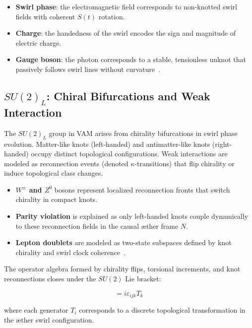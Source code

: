 \documentclass[preprint]{revtex4-2}
\begin{document}
    \begin{itemize}
        \item \textbf{Swirl phase}: the electromagnetic field corresponds to non-knotted swirl fields with coherent \( S(t) \) rotation.
        \item \textbf{Charge}: the handedness of the swirl encodes the sign and magnitude of electric charge.
        \item \textbf{Gauge boson}: the photon corresponds to a stable, tensionless unknot that passively follows swirl lines without curvature~\cite{ranada1992knots}.
    \end{itemize}

    \subsection{\textbf{\boldmath\texorpdfstring{$SU(2)_L$}{SU(2)L}}: Chiral Bifurcations and Weak Interaction}
    The \( SU(2)_L \) group in VAM arises from chirality bifurcations in swirl phase evolution. Matter-like knots (left-handed) and antimatter-like knots (right-handed) occupy distinct topological configurations. Weak interactions are modeled as reconnection events (denoted \( \kappa \)-transitions) that flip chirality or induce topological class changes.

    \begin{itemize}
        \item \textbf{\( W^\pm \) and \( Z^0 \)} bosons represent localized reconnection fronts that switch chirality in compact knots.
        \item \textbf{Parity violation} is explained as only left-handed knots couple dynamically to these reconnection fields in the causal æther frame \( N \).
        \item \textbf{Lepton doublets} are modeled as two-state subspaces defined by knot chirality and swirl clock coherence~\cite{volovik2003universe}.
    \end{itemize}

    The operator algebra formed by chirality flips, torsional increments, and knot reconnections closes under the \( SU(2) \) Lie bracket:

    \begin{equation}
    [T_i, T_j] = i \varepsilon_{ijk} T_k
    \end{equation}

    where each generator \( T_i \) corresponds to a discrete topological transformation in the æther swirl configuration.
\end{document}
